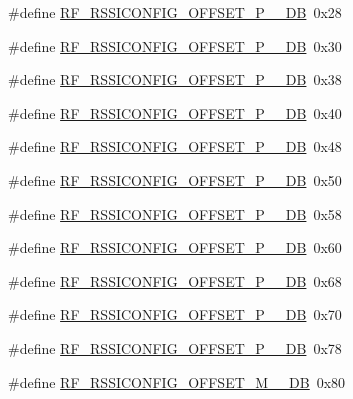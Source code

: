 \begin{DoxyCompactItemize}
\item 
\#define \mbox{\hyperlink{sx1276_regs-_fsk_8h_a3c460ec9034b813510375d7c2e111141}{R\+F\+\_\+\+R\+S\+S\+I\+C\+O\+N\+F\+I\+G\+\_\+\+O\+F\+F\+S\+E\+T\+\_\+\+P\+\_\+\_\+\+DB}}~0x28
\item 
\#define \mbox{\hyperlink{sx1276_regs-_fsk_8h_a71cb3712a518504dc00192bd7830d0fc}{R\+F\+\_\+\+R\+S\+S\+I\+C\+O\+N\+F\+I\+G\+\_\+\+O\+F\+F\+S\+E\+T\+\_\+\+P\+\_\+\_\+\+DB}}~0x30
\item 
\#define \mbox{\hyperlink{sx1276_regs-_fsk_8h_a2e7c3aaf7c9271cab8f33ffb42d016ac}{R\+F\+\_\+\+R\+S\+S\+I\+C\+O\+N\+F\+I\+G\+\_\+\+O\+F\+F\+S\+E\+T\+\_\+\+P\+\_\+\_\+\+DB}}~0x38
\item 
\#define \mbox{\hyperlink{sx1276_regs-_fsk_8h_a523fcb82c45be7b2f269a9c20c5063e3}{R\+F\+\_\+\+R\+S\+S\+I\+C\+O\+N\+F\+I\+G\+\_\+\+O\+F\+F\+S\+E\+T\+\_\+\+P\+\_\+\_\+\+DB}}~0x40
\item 
\#define \mbox{\hyperlink{sx1276_regs-_fsk_8h_a070ede192c6134e05ce21875038d2525}{R\+F\+\_\+\+R\+S\+S\+I\+C\+O\+N\+F\+I\+G\+\_\+\+O\+F\+F\+S\+E\+T\+\_\+\+P\+\_\+\_\+\+DB}}~0x48
\item 
\#define \mbox{\hyperlink{sx1276_regs-_fsk_8h_afbfdf21feffd708399f947db0aa2bc09}{R\+F\+\_\+\+R\+S\+S\+I\+C\+O\+N\+F\+I\+G\+\_\+\+O\+F\+F\+S\+E\+T\+\_\+\+P\+\_\+\_\+\+DB}}~0x50
\item 
\#define \mbox{\hyperlink{sx1276_regs-_fsk_8h_ae11e2cc321929764afe9df5c5bb750ea}{R\+F\+\_\+\+R\+S\+S\+I\+C\+O\+N\+F\+I\+G\+\_\+\+O\+F\+F\+S\+E\+T\+\_\+\+P\+\_\+\_\+\+DB}}~0x58
\item 
\#define \mbox{\hyperlink{sx1276_regs-_fsk_8h_abce6efdb35695bf504c61bc91edd06bd}{R\+F\+\_\+\+R\+S\+S\+I\+C\+O\+N\+F\+I\+G\+\_\+\+O\+F\+F\+S\+E\+T\+\_\+\+P\+\_\+\_\+\+DB}}~0x60
\item 
\#define \mbox{\hyperlink{sx1276_regs-_fsk_8h_a636e0b5757980dd446fd0f8d68ff7bec}{R\+F\+\_\+\+R\+S\+S\+I\+C\+O\+N\+F\+I\+G\+\_\+\+O\+F\+F\+S\+E\+T\+\_\+\+P\+\_\+\_\+\+DB}}~0x68
\item 
\#define \mbox{\hyperlink{sx1276_regs-_fsk_8h_adb4617e4a26c0967429266f47635854c}{R\+F\+\_\+\+R\+S\+S\+I\+C\+O\+N\+F\+I\+G\+\_\+\+O\+F\+F\+S\+E\+T\+\_\+\+P\+\_\+\_\+\+DB}}~0x70
\item 
\#define \mbox{\hyperlink{sx1276_regs-_fsk_8h_a9bc9864b2deb63ce4851767aa20d13fe}{R\+F\+\_\+\+R\+S\+S\+I\+C\+O\+N\+F\+I\+G\+\_\+\+O\+F\+F\+S\+E\+T\+\_\+\+P\+\_\+\_\+\+DB}}~0x78
\item 
\#define \mbox{\hyperlink{sx1276_regs-_fsk_8h_aeffccc68b7d23a19aaa8af6531d2d2ce}{R\+F\+\_\+\+R\+S\+S\+I\+C\+O\+N\+F\+I\+G\+\_\+\+O\+F\+F\+S\+E\+T\+\_\+\+M\+\_\+\_\+\+DB}}~0x80

\end{DoxyCompactItemize}
